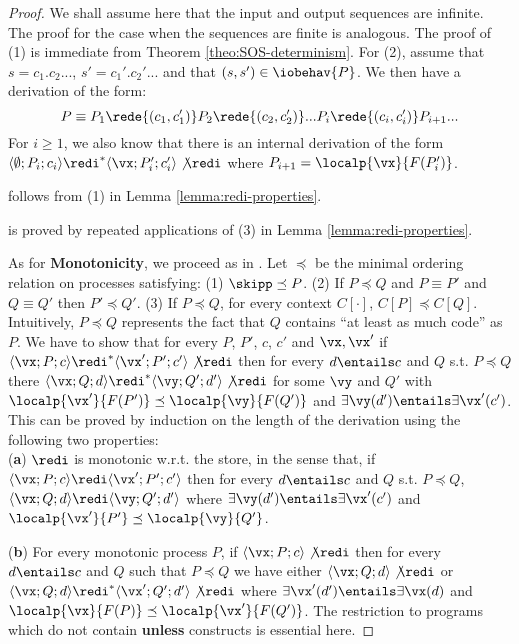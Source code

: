 \documentclass{tlp}
\begin{document}
\begin{proof}
We shall assume here that the input and output sequences are infinite. The proof for the case when the sequences are finite is analogous. 
The proof of (1) is immediate from Theorem \ref{theo:SOS-determinism}.  For (2), assume that $s=c_1.c_2...$, $s'=c_1'.c_2'...$ and that $(s,s') \in  \iobehav{P}$. We then have a derivation of the form:
\[
P \equiv P_1 \rede{(c_1,c_1')} P_2 \rede{(c_2,c_2')} ... P_i \rede{(c_i,c_i')} P_{i+1} ... 
\]
For $ i\geq 1$, we also know that there is an internal derivation of the form
$
\langle \emptyset;  P_i ; c_i\rangle \redi^*  \langle \vx; P_i' ; c_i'\rangle \not\redi
$
 where  $P_{i+1} = \localp{\vx}{F(P_i')} $.  

  follows from  (1) in 
Lemma \ref{lemma:redi-properties}. 

  is proved by repeated applications of (3) in Lemma \ref{lemma:redi-properties}.
 
As for  {\bf Monotonicity}, we proceed as in  \cite{NPV02}. Let $\preceq$ be the minimal ordering relation on  processes satisfying: (1)  $\skipp \preceq P$. (2) If $P \preceq Q$ and $P\equiv P'$ and $Q\equiv Q'$ then 
	$P' \preceq Q'$. (3) If $P \preceq Q$, for every context $C[\cdot]$, $C[P] \preceq C[Q]$.
	Intuitively, $P \preceq Q$  represents the fact that $Q$ contains ``at least as much code'' as $P$. We have to show that for every $P$, $P'$, $c$, $c'$  and $\vx,\vx'$ if 
$\langle \vx; P;c \rangle \redi^*\langle \vx';P';c' \rangle\not\redi$  then for every $d\entails c$ and $Q$ s.t. $P\preceq Q$ there 
$\langle \vx; Q;d \rangle \redi^*\langle \vy;Q';d' \rangle\not\redi$
for some  $\vy$ and $Q'$ with $\localp{\vx'}{F(P')} \preceq \localp{\vy}{F(Q')}$ and  $\exists \vy(d') \entails \exists \vx'(c')$.
 This can be proved by induction on the  length of the derivation using the following two properties:\\
\noindent ({\bf a}) 
$\redi$ is monotonic w.r.t. the store, in the sense that,  if $\langle \vx; P;c \rangle \redi \langle \vx';P';c' \rangle$ then for every $d \entails c$ and $Q$ s.t. 
$P \preceq Q$, 
$\langle\vx; Q;d \rangle \redi \langle \vy; Q';d' \rangle$ where $\exists \vy(d') \entails \exists \vx'(c')$
and $\localp {\vx'}{P'} \preceq \localp{\vy}{Q'}$.


\noindent ({\bf b}) For every monotonic process $P$, if $\langle  \vx;
	P;c\rangle \not\redi$ then for every $d\entails c$ and  $Q$ 
	such that $P \preceq Q$ we have either 
 $\langle\vx; Q;d\rangle \not\redi$ or 
 $\langle \vx; Q;d\rangle \redi^* \langle \vx';Q';d' \rangle \not\redi$ where 
 $\exists \vx'(d') \entails \exists \vx(d)$ and  $\localp{\vx}{F(P)} \preceq \localp{\vx'}{F(Q')}$.
The restriction to  programs which do not contain {\bf unless}  constructs is essential  here. \end{proof}
\end{document}
